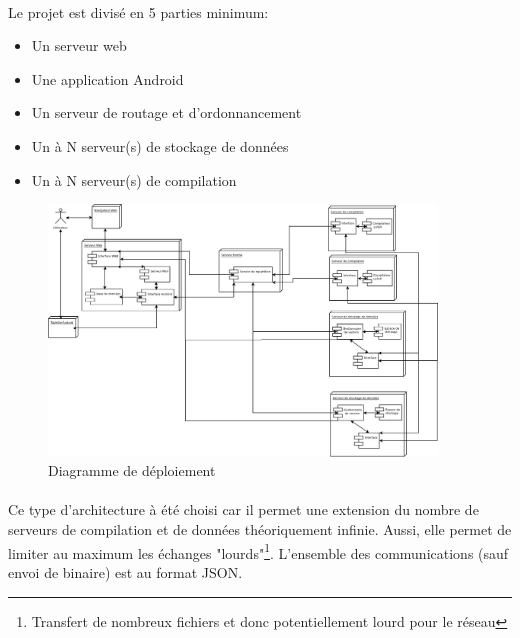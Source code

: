 \documentclass[a4paper,12pt]{article}
\begin{document}
\paragraph*{}
Le projet est divisé en 5 parties minimum:
\begin{itemize}
 \item Un serveur web
 \item Une application Android
 \item Un serveur de routage et d'ordonnancement
 \item Un à N serveur(s) de stockage de données
 \item Un à N serveur(s) de compilation
\end{itemize}

\begin{figure}[!ht]
\begin{center}
  \includegraphics[width=0.92\textwidth,angle=90]{./images/DiagrammeDeploiement.jpg}
\end{center}
  \caption{Diagramme de déploiement}
  \label{déploiement}
\end{figure}

\paragraph*{}
Ce type d'architecture à été choisi car il permet une extension du nombre de serveurs de compilation et de données théoriquement infinie. Aussi, elle permet de limiter au maximum les échanges "lourds"\footnote{Transfert de nombreux fichiers et donc potentiellement lourd pour le réseau}. L'ensemble des communications (sauf envoi de binaire) est au format JSON.
\end{document}

